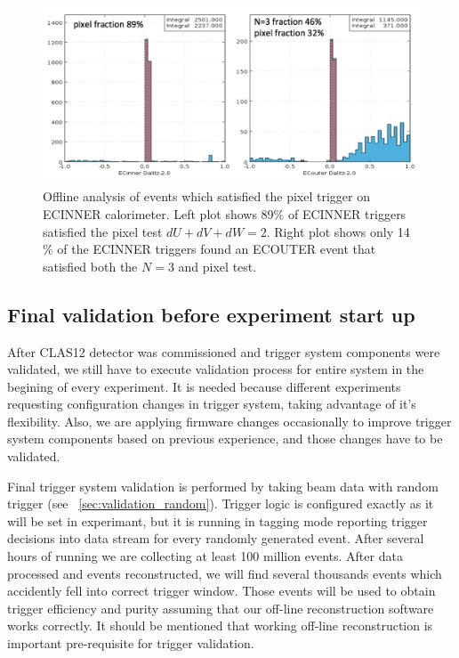 \begin{figure}[!htb]
 \centering
  \includegraphics[width=1.0\columnwidth,keepaspectratio]{img/PixelFraction.png}
 \caption{Offline analysis of events which satisfied the pixel trigger on ECINNER calorimeter.  Left plot shows 89$\%$ of ECINNER triggers satisfied the pixel test $dU+dV+dW=2$.  Right plot shows only 14$\%$ of the ECINNER triggers found an ECOUTER event that satisfied both the $N=3$ and pixel test. }
\end{figure}




\subsection{Final validation before experiment start up}

After CLAS12 detector was commissioned and trigger system components were validated, we still have to execute validation process for entire system in the begining of every experiment. It is needed because different experiments requesting configuration changes in trigger system, taking advantage of it's flexibility. Also, we are applying firmware changes occasionally to improve trigger system components based on previous experience, and those changes have to be validated.

Final trigger system validation is performed by taking beam data with random trigger (see ~\ref{sec:validation_random}).
Trigger logic is configured exactly as it will be set in experimant, but it is running in tagging mode reporting trigger decisions into data stream for every randomly generated event. After several hours of running we are collecting at least 100 million events. After data processed and events reconstructed, we will find several thousands events which accidently fell into correct trigger window. Those events will be used to obtain trigger efficiency and purity assuming that our off-line reconstruction software works correctly. It should be mentioned that working off-line reconstruction is important pre-requisite for trigger validation.

